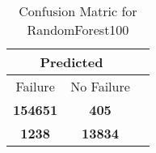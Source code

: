 \begin{table}[] 
\caption{Confusion Matric for RandomForest100} 
\label{Table: Prediction Accuracy-LOFRandomForest100100.0EKF-ignoreReflection-Reflection} 
\centering 
\begin{tabular} 
 {@{}ccc@{}} 
\toprule 
\multicolumn{2}{c}{\textbf{Predicted}}
 \\ \midrule 
\multicolumn{1}{|c|}{Failure} & 
\multicolumn{1}{c|}{No Failure}
 \\ \midrule 
\multicolumn{1}{|c|}{\color{green}\textbf{154651}} & 
\multicolumn{1}{c|}{\color{red}\textbf{405}}
 \\ \midrule 
\multicolumn{1}{|c|}{\color{red}\textbf{1238}} & 
\multicolumn{1}{c|}{\color{green}\textbf{13834}}
 \\ \bottomrule 
\end{tabular} 
\end{table} 
